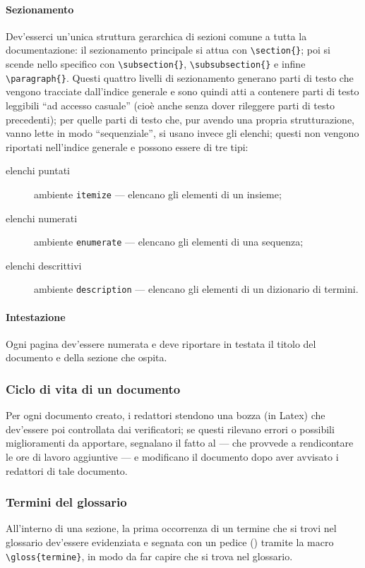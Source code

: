 \paragraph{Sezionamento} Dev'esserci un'unica struttura gerarchica di sezioni comune a tutta la documentazione: il sezionamento principale si attua con \texttt{\textbackslash section\{\}}; poi si scende nello specifico con \texttt{\textbackslash subsection\{\}}, \texttt{\textbackslash subsubsection\{\}} e infine \texttt{\textbackslash paragraph\{\}}. Questi quattro livelli di sezionamento generano parti di testo che vengono tracciate dall'indice generale e sono quindi atti a contenere parti di testo leggibili “ad accesso casuale” (cioè anche senza dover rileggere parti di testo precedenti); per quelle parti di testo che, pur avendo una propria strutturazione, vanno lette in modo “sequenziale”, si usano invece gli elenchi; questi non vengono riportati nell'indice generale e possono essere di tre tipi:
\begin{description}
	\item[elenchi puntati] ambiente \texttt{itemize} --- elencano gli elementi di un insieme;
	\item[elenchi numerati] ambiente \texttt{enumerate} --- elencano gli elementi di una sequenza;
	\item[elenchi descrittivi] ambiente \texttt{description} --- elencano gli elementi di un dizionario di termini.
\end{description}
\paragraph{Intestazione} Ogni pagina dev'essere numerata e deve riportare in testata il titolo del documento e della sezione che ospita. %

\subsubsection{Ciclo di vita di un documento} Per ogni documento creato, i redattori stendono una bozza (in Latex) che dev'essere poi controllata dai verificatori; se questi rilevano errori o possibili miglioramenti da apportare, segnalano il fatto al  --- che provvede a rendicontare le ore di lavoro aggiuntive --- e modificano il documento dopo aver avvisato i redattori di tale documento.

\subsubsection{Termini del glossario} All'interno di una sezione, la prima occorrenza di un termine che si trovi nel glossario dev'essere evidenziata e segnata con un pedice () tramite la macro \texttt{\textbackslash gloss\{termine\}}, in modo da far capire che si trova nel glossario.

